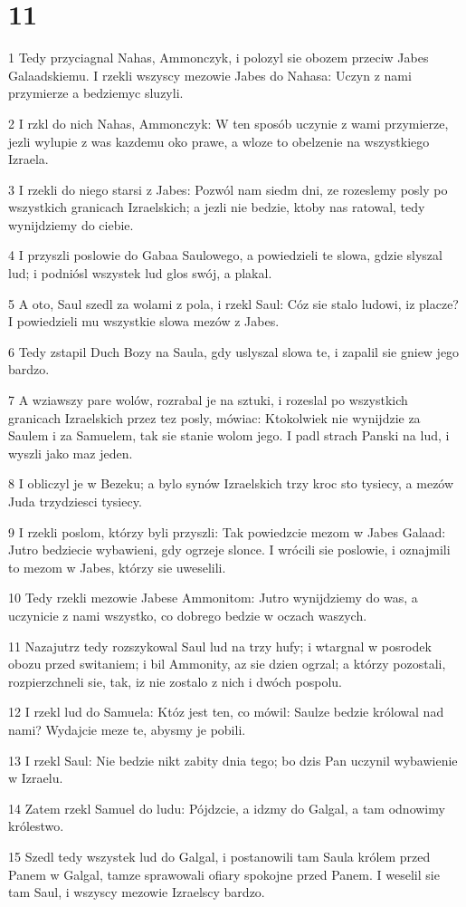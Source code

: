 \chapter{11}

\par 1 Tedy przyciagnal Nahas, Ammonczyk, i polozyl sie obozem przeciw Jabes Galaadskiemu. I rzekli wszyscy mezowie Jabes do Nahasa: Uczyn z nami przymierze a bedziemyc sluzyli.
\par 2 I rzkl do nich Nahas, Ammonczyk: W ten sposób uczynie z wami przymierze, jezli wylupie z was kazdemu oko prawe, a wloze to obelzenie na wszystkiego Izraela.
\par 3 I rzekli do niego starsi z Jabes: Pozwól nam siedm dni, ze rozeslemy posly po wszystkich granicach Izraelskich; a jezli nie bedzie, ktoby nas ratowal, tedy wynijdziemy do ciebie.
\par 4 I przyszli poslowie do Gabaa Saulowego, a powiedzieli te slowa, gdzie slyszal lud; i podniósl wszystek lud glos swój, a plakal.
\par 5 A oto, Saul szedl za wolami z pola, i rzekl Saul: Cóz sie stalo ludowi, iz placze? I powiedzieli mu wszystkie slowa mezów z Jabes.
\par 6 Tedy zstapil Duch Bozy na Saula, gdy uslyszal slowa te, i zapalil sie gniew jego bardzo.
\par 7 A wziawszy pare wolów, rozrabal je na sztuki, i rozeslal po wszystkich granicach Izraelskich przez tez posly, mówiac: Ktokolwiek nie wynijdzie za Saulem i za Samuelem, tak sie stanie wolom jego. I padl strach Panski na lud, i wyszli jako maz jeden.
\par 8 I obliczyl je w Bezeku; a bylo synów Izraelskich trzy kroc sto tysiecy, a mezów Juda trzydziesci tysiecy.
\par 9 I rzekli poslom, którzy byli przyszli: Tak powiedzcie mezom w Jabes Galaad: Jutro bedziecie wybawieni, gdy ogrzeje slonce. I wrócili sie poslowie, i oznajmili to mezom w Jabes, którzy sie uweselili.
\par 10 Tedy rzekli mezowie Jabese Ammonitom: Jutro wynijdziemy do was, a uczynicie z nami wszystko, co dobrego bedzie w oczach waszych.
\par 11 Nazajutrz tedy rozszykowal Saul lud na trzy hufy; i wtargnal w posrodek obozu przed switaniem; i bil Ammonity, az sie dzien ogrzal; a którzy pozostali, rozpierzchneli sie, tak, iz nie zostalo z nich i dwóch pospolu.
\par 12 I rzekl lud do Samuela: Któz jest ten, co mówil: Saulze bedzie królowal nad nami? Wydajcie meze te, abysmy je pobili.
\par 13 I rzekl Saul: Nie bedzie nikt zabity dnia tego; bo dzis Pan uczynil wybawienie w Izraelu.
\par 14 Zatem rzekl Samuel do ludu: Pójdzcie, a idzmy do Galgal, a tam odnowimy królestwo.
\par 15 Szedl tedy wszystek lud do Galgal, i postanowili tam Saula królem przed Panem w Galgal, tamze sprawowali ofiary spokojne przed Panem. I weselil sie tam Saul, i wszyscy mezowie Izraelscy bardzo.

